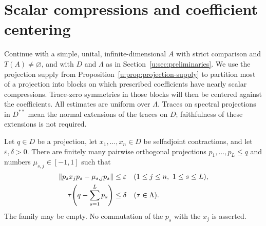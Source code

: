 \section{Scalar compressions and coefficient centering}
\label{u:sec:centering}

Continue with a simple, unital, infinite-dimensional $A$ with strict
comparison and $T(A)\ne\varnothing$, and with $D$ and $\Lambda$ as in
Section~\ref{u:sec:preliminaries}.  We use the projection supply from
Proposition~\ref{u:prop:projection-supply} to partition most of a
projection into blocks on which prescribed coefficients have nearly
scalar compressions.  Trace-zero symmetries in those blocks will then
be centered against the coefficients.  All estimates are uniform over
$\Lambda$.  Traces on spectral projections in $D^{**}$ mean the normal
extensions of the traces on $D$; faithfulness of these extensions is
not required.

\begin{lemma}
\label{u:lem:scalar-compressions}
Let $q\in D$ be a projection, let $x_1,\ldots,x_n\in D$ be selfadjoint
contractions, and let $\varepsilon,\delta>0$.  There are finitely many
pairwise orthogonal projections $p_1,\ldots,p_L\le q$ and numbers
$\mu_{s,j}\in[-1,1]$ such that
\begin{equation}
\label{u:eq:scalar-compressions}
 \begin{split}
 \lVert p_sx_jp_s-\mu_{s,j}p_s\rVert&\le\varepsilon
       \quad(1\le j\le n,\ 1\le s\le L),\\
 \tau\!\left(q-\sum_{s=1}^L p_s\right)&\le\delta
       \quad(\tau\in\Lambda).
 \end{split}
\end{equation}
The family may be empty.  No commutation of the $p_s$ with the $x_j$ is
asserted.
\end{lemma}

